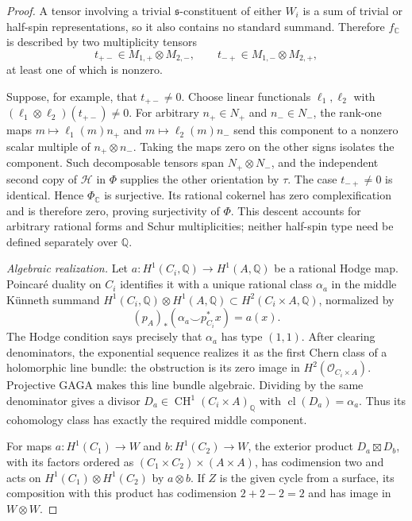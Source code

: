 \documentclass[11pt]{amsart}
\newcommand{\Q}{\mathbb Q}
\newcommand{\C}{\mathbb C}
\DeclareMathOperator{\CH}{CH}
\DeclareMathOperator{\cl}{cl}
\theoremstyle{definition}
\theoremstyle{remark}
\numberwithin{equation}{section}
\begin{document}
\begin{proof}
A tensor involving a trivial $\mathfrak s$-constituent of either
$W_i$ is a sum of trivial or half-spin representations, so it also
contains no standard summand.  Therefore $f_{\C}$ is described by two
multiplicity tensors
\[
 t_{+-}\in M_{1,+}\otimes M_{2,-},
 \qquad
 t_{-+}\in M_{1,-}\otimes M_{2,+},
\]
at least one of which is nonzero.

Suppose, for example, that $t_{+-}\ne0$.  Choose linear functionals
$\ell_1,\ell_2$ with
$(\ell_1\otimes\ell_2)(t_{+-})\ne0$.  For arbitrary
$n_+\in N_+$ and $n_-\in N_-$, the rank-one maps
$m\mapsto\ell_1(m)n_+$ and $m\mapsto\ell_2(m)n_-$ send this component
to a nonzero scalar multiple of $n_+\otimes n_-$.  Taking the maps
zero on the other signs isolates the component.  Such decomposable
tensors span $N_+\otimes N_-$, and the independent second copy of $\mathcal H$
in $\Phi$ supplies the other orientation by $\tau$.  The case
$t_{-+}\ne0$ is identical.  Hence $\Phi_{\C}$ is surjective.  Its
rational cokernel has zero complexification and is therefore zero,
proving surjectivity of $\Phi$.  This descent accounts for arbitrary
rational forms and Schur multiplicities; neither half-spin type need
be defined separately over $\Q$.

\emph{Algebraic realization.}
Let $a:H^1(C_i,\Q)\to H^1(A,\Q)$ be a rational Hodge map.
Poincar\'e duality on $C_i$ identifies it with a unique rational
class $\alpha_a$ in the middle K\"unneth summand
$H^1(C_i,\Q)\otimes H^1(A,\Q)\subset H^2(C_i\times A,\Q)$,
normalized by
\[
 (p_A)_*(\alpha_a\smile p_{C_i}^*x)=a(x).
\]
The Hodge condition says precisely that $\alpha_a$ has type $(1,1)$.
After clearing denominators, the exponential sequence realizes it
as the first Chern class of a holomorphic line bundle: the
obstruction is its zero image in $H^2(\mathcal O_{C_i\times A})$.
Projective GAGA makes this line bundle algebraic.  Dividing by the
same denominator gives a divisor
$D_a\in\CH^1(C_i\times A)_\Q$ with $\cl(D_a)=\alpha_a$.
Thus its cohomology class has exactly the required middle component.

For maps $a:H^1(C_1)\to W$ and $b:H^1(C_2)\to W$, the exterior
product $D_a\boxtimes D_b$, with its factors ordered as
$(C_1\times C_2)\times(A\times A)$, has codimension two and acts
on $H^1(C_1)\otimes H^1(C_2)$ by $a\otimes b$.
If $Z$ is the given cycle from a surface, its composition with this
product has codimension $2+2-2=2$ and has image in $W\otimes W$.


\end{proof}
\end{document}
